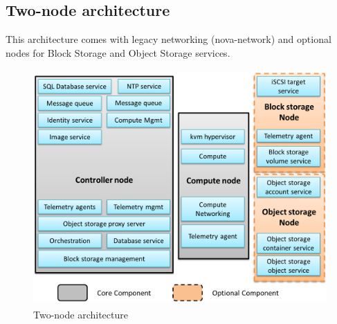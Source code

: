     \subsection{Two-node architecture}
    \par This architecture comes with legacy networking (nova-network) and optional nodes for Block Storage and Object Storage services.
    
    \begin{figure}[h]
        \centering
        \includegraphics[width=15cm,height=9cm]{images/two_node_arch.png}
        \caption{Two-node architecture}
    \end{figure}
    
